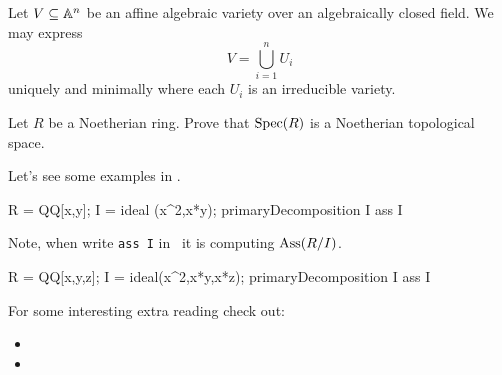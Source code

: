 \documentclass{ximera}
\begin{document}
\begin{theorem}
  Let $V\subseteq\mathbb A^n$ be an affine algebraic variety over an
  algebraically closed field. We may express
  \[
  V = \bigcup_{i=1}^n U_i
  \]
  uniquely and minimally where each $U_i$ is an irreducible variety.
\end{theorem}


\begin{exercise}
  Let $R$ be a Noetherian ring. Prove that $\operatorname{Spec}(R)$ is a Noetherian topological space. 
\end{exercise}


Let's see some examples in \macaulay.

\begin{macaulay2}
R = QQ[x,y];
I = ideal (x^2,x*y);
primaryDecomposition I
ass I
\end{macaulay2}

Note, when write \texttt{ass I} in \macaulay\, it is computing
$\operatorname{Ass}(R/I)$.

\begin{macaulay2}
R = QQ[x,y,z];
I = ideal(x^2,x*y,x*z);
primaryDecomposition I
ass I
\end{macaulay2}









For some interesting extra reading check out:
\begin{itemize}
\item {}

\item {}


\end{itemize}
\end{document}
